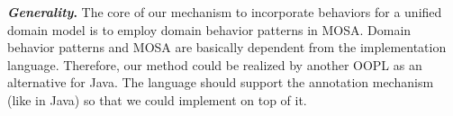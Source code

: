 
\textbf{\textit{Generality}.} The core of our mechanism to incorporate behaviors for a unified domain model is to employ domain behavior patterns in MOSA. Domain behavior patterns and MOSA are basically dependent from the implementation language. Therefore, our method could be realized by another OOPL as an alternative for Java. The language should support the annotation mechanism (like in Java) so that we could implement \agldcsl on top of it.







